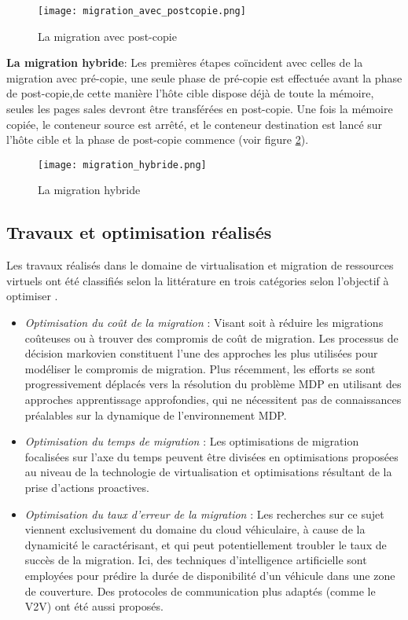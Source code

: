 \begin{figure}[H]
\centering
\texttt{[image: migration\_avec\_postcopie.png]}
\caption{La migration avec post-copie \cite{puliafito2019}}
\label{fig:migration_avec_postcopie2}
\end{figure}
\textbf{La migration hybride}: Les premières étapes coïncident avec celles de la migration avec pré-copie, une seule phase de pré-copie est effectuée avant la phase de post-copie,de cette manière l'hôte cible dispose déjà de toute la mémoire, seules les pages sales devront être transférées en post-copie. Une fois la mémoire copiée, le conteneur source est arrêté, et le conteneur destination est lancé sur l'hôte cible et la phase de post-copie commence \cite{wikimigration} (voir figure \ref{fig:migration_hybride}).
\begin{figure}[H]
\centering
\texttt{[image: migration\_hybride.png]}
\caption{La migration hybride \cite{puliafito2019}}
\label{fig:migration_hybride}
\end{figure}

\subsection{Travaux et optimisation réalisés}
Les travaux réalisés dans le domaine de virtualisation et migration de ressources virtuels ont été classifiés selon la littérature en trois catégories selon l'objectif à optimiser \cite{rejiba2019}.
\begin{itemize}
  \item \emph{Optimisation du coût de la migration} : Visant soit à réduire les migrations coûteuses ou à trouver des compromis de coût de migration. Les processus de décision markovien constituent l'une des approches les plus utilisées pour modéliser le compromis de migration. Plus récemment, les efforts se sont progressivement déplacés vers la résolution du problème MDP en utilisant des approches apprentissage approfondies, qui ne nécessitent pas de connaissances préalables sur la dynamique de l'environnement MDP.
  \item \emph{Optimisation du temps de migration} : Les optimisations de migration focalisées sur l'axe du temps peuvent être divisées en optimisations proposées au niveau de la technologie de virtualisation et optimisations résultant de la prise d'actions proactives.
  \item \emph{Optimisation du taux d'erreur de la migration} : Les recherches sur ce sujet viennent exclusivement du domaine du cloud véhiculaire, à cause de la dynamicité le caractérisant, et qui peut potentiellement troubler le taux de succès de la migration. Ici, des techniques d'intelligence artificielle sont employées pour prédire la durée de disponibilité d'un véhicule dans une zone de couverture. Des protocoles de communication plus adaptés (comme le V2V) ont été aussi proposés.
\end{itemize}
